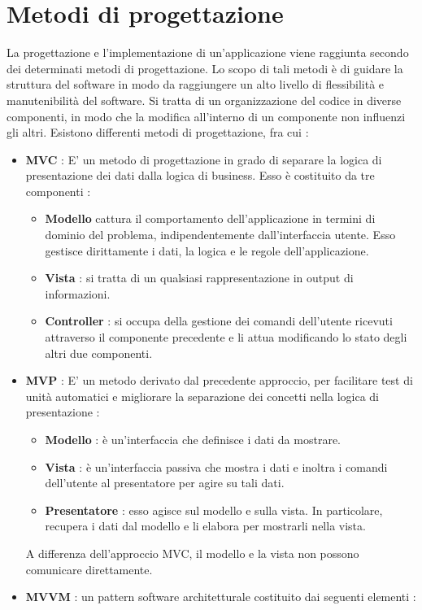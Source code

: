 \documentclass[12pt]{report}
\begin{document}
\section{Metodi di progettazione}
La progettazione e l'implementazione di un'applicazione viene raggiunta secondo dei determinati metodi di progettazione. Lo scopo di tali metodi è di guidare la struttura del software in modo da raggiungere un alto livello di flessibilità e manutenibilità del software. Si tratta di un organizzazione del codice in diverse componenti, in modo che la modifica all'interno di un componente non influenzi gli altri. Esistono differenti metodi di progettazione, fra cui :
\begin{itemize}
\item \textbf{MVC} : E' un metodo di progettazione in grado di separare la logica di presentazione dei dati dalla logica di business. Esso è costituito da tre componenti : 
\begin{itemize}
\item \textbf{Modello} cattura il comportamento dell'applicazione in termini di dominio del problema, indipendentemente dall'interfaccia utente. Esso gestisce dirittamente i dati, la logica e le regole dell'applicazione.
\item \textbf{Vista} : si tratta di un qualsiasi rappresentazione in output di informazioni.
\item \textbf{Controller} : si occupa della gestione dei comandi dell'utente ricevuti attraverso il componente precedente e li attua modificando lo stato degli altri due componenti.
\end{itemize}
\item \textbf{MVP} : E' un metodo derivato dal precedente approccio, per facilitare test di unità automatici e migliorare la separazione dei concetti nella logica di presentazione :
\begin{itemize}
\item \textbf{Modello} : è un'interfaccia che definisce i dati da mostrare.
\item \textbf{Vista} : è un'interfaccia passiva che mostra i dati e inoltra i comandi dell'utente al presentatore per agire su tali dati.
\item \textbf{Presentatore} : esso agisce sul modello e sulla vista. In particolare, recupera i dati dal modello e li elabora per mostrarli nella vista.
\end{itemize}
A differenza dell'approccio MVC, il modello e la vista non possono comunicare direttamente.
\item \textbf{MVVM} : un pattern software architetturale costituito dai seguenti elementi :

\end{itemize}
\end{document}
